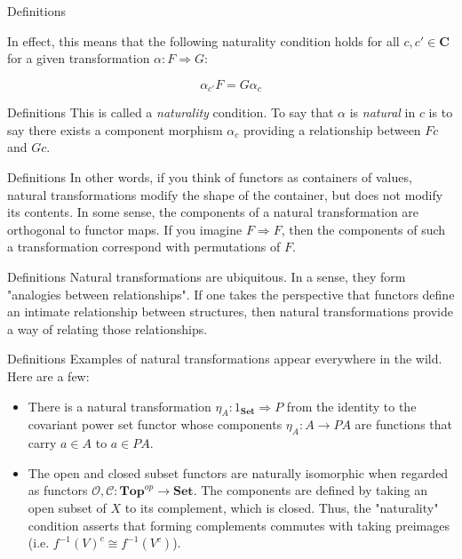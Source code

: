 \documentclass[tikz]{beamer}
\theoremstyle{definition}
\begin{document}
\begin{frame}{Definitions}

In effect, this means that the following naturality condition holds for all $c, c' \in \mathbf{C}$ for a given transformation $\alpha: F \Rightarrow G$:

\begin{center}
    \begin{equation*}
        \alpha_{c'}F = G \alpha_c
    \end{equation*}{}
\end{center}{}
\end{frame}

\begin{frame}{Definitions}
    This is called a \textit{naturality} condition. To say that $\alpha$ is \textit{natural} in $c$ is to say there exists a component morphism $\alpha_c$ providing a relationship between $Fc$ and $Gc$.
\end{frame}

\begin{frame}{Definitions}
    In other words, if you think of functors as containers of values, natural transformations modify the shape of the container, but does not modify its contents. In some sense, the components of a natural transformation are orthogonal to functor maps. If you imagine $F \Rightarrow F$, then the components of such a transformation correspond with permutations of $F$.
\end{frame}

\begin{frame}{Definitions}
    Natural transformations are ubiquitous. In a sense, they form "analogies between relationships". If one takes the perspective that functors define an intimate relationship between structures, then natural transformations provide a way of relating those relationships.
\end{frame}

\begin{frame}{Definitions}
    Examples of natural transformations appear everywhere in the wild. Here are a few:

    \begin{itemize}
        \item There is a natural transformation $\eta_A : 1_{\mathbf{Set}} \Rightarrow P$ from the identity to the covariant power set functor whose components $\eta_A : A \to PA$ are functions that carry $a \in A$ to ${a} \in PA$.

        \item The open and closed subset functors are naturally isomorphic when regarded as functors $\mathcal{O},\mathcal{C}: \mathbf{Top}^{op} \to \mathbf{Set}$. The components are defined by taking an open subset of $X$ to its complement, which is closed. Thus, the "naturality" condition asserts that forming complements commutes with taking preimages (i.e. $f^{-1}(V)^c \cong f^{-1}(V^c)$).
    \end{itemize}{}
\end{frame}
\end{document}
